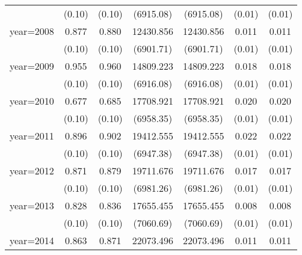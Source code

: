 {\begin{tabular}{l*{6}{c}}
                    &      (0.10)         &      (0.10)         &   (6915.08)         &   (6915.08)         &      (0.01)         &      (0.01)         \\
year=2008           &       0.877\sym{***}&       0.880\sym{***}&   12430.856         &   12430.856         &       0.011         &       0.011         \\
                    &      (0.10)         &      (0.10)         &   (6901.71)         &   (6901.71)         &      (0.01)         &      (0.01)         \\
year=2009           &       0.955\sym{***}&       0.960\sym{***}&   14809.223\sym{*}  &   14809.223\sym{*}  &       0.018\sym{*}  &       0.018\sym{*}  \\
                    &      (0.10)         &      (0.10)         &   (6916.08)         &   (6916.08)         &      (0.01)         &      (0.01)         \\
year=2010           &       0.677\sym{***}&       0.685\sym{***}&   17708.921\sym{*}  &   17708.921\sym{*}  &       0.020\sym{**} &       0.020\sym{**} \\
                    &      (0.10)         &      (0.10)         &   (6958.35)         &   (6958.35)         &      (0.01)         &      (0.01)         \\
year=2011           &       0.896\sym{***}&       0.902\sym{***}&   19412.555\sym{**} &   19412.555\sym{**} &       0.022\sym{**} &       0.022\sym{**} \\
                    &      (0.10)         &      (0.10)         &   (6947.38)         &   (6947.38)         &      (0.01)         &      (0.01)         \\
year=2012           &       0.871\sym{***}&       0.879\sym{***}&   19711.676\sym{**} &   19711.676\sym{**} &       0.017\sym{*}  &       0.017\sym{*}  \\
                    &      (0.10)         &      (0.10)         &   (6981.26)         &   (6981.26)         &      (0.01)         &      (0.01)         \\
year=2013           &       0.828\sym{***}&       0.836\sym{***}&   17655.455\sym{*}  &   17655.455\sym{*}  &       0.008         &       0.008         \\
                    &      (0.10)         &      (0.10)         &   (7060.69)         &   (7060.69)         &      (0.01)         &      (0.01)         \\
year=2014           &       0.863\sym{***}&       0.871\sym{***}&   22073.496\sym{**} &   22073.496\sym{**} &       0.011         &       0.011         \\

\end{tabular}}
